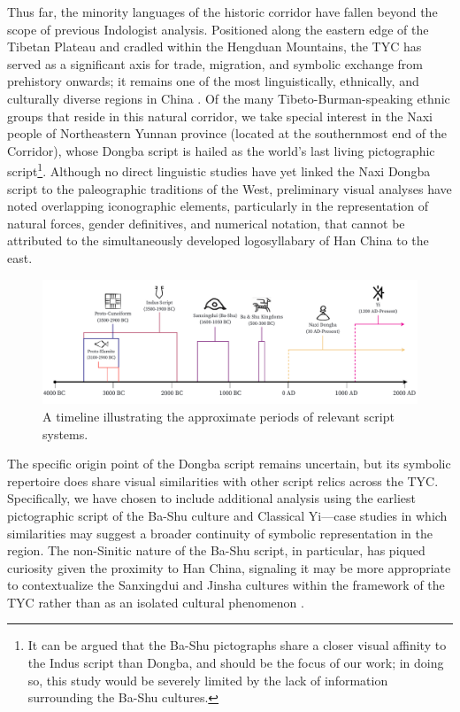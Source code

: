\documentclass[11pt,a4paper,oneside]{report}
\begin{document}
Thus far, the minority languages of the historic corridor have fallen beyond the scope of previous Indologist analysis. Positioned along the eastern edge of the Tibetan Plateau and cradled within the Hengduan Mountains, the TYC has served as a significant axis for trade, migration, and symbolic exchange from prehistory onwards; it remains one of the most linguistically, ethnically, and culturally diverse regions in China \cite{shi_ethnic_2018}. Of the many Tibeto-Burman-speaking ethnic groups that reside in this natural corridor, we take special interest in the Naxi people of Northeastern Yunnan province (located at the southernmost end of the Corridor), whose Dongba script is hailed as the world's last living pictographic script\footnote{It can be argued that the Ba-Shu pictographs share a closer visual affinity to the Indus script than Dongba, and should be the focus of our work; in doing so, this study would be severely limited by the lack of information surrounding the Ba-Shu cultures.}. Although no direct linguistic studies have yet linked the Naxi Dongba script to the paleographic traditions of the West, preliminary visual analyses \cite{city_museum_of_naxi_culture_comparison_nodate} have noted overlapping iconographic elements, particularly in the representation of natural forces, gender definitives, and numerical notation, that cannot be attributed to the simultaneously developed logosyllabary of Han China to the east.

\begin{figure}[H] 
    \centering
    \includegraphics[width=1\textwidth]{Visualizations/Figures/Timeline.pdf}
    \caption[Script Usage Timeline]{A timeline illustrating the approximate periods of relevant script systems.}
    \label{fig:timeline}
\end{figure}

The specific origin point of the Dongba script remains uncertain, but its symbolic repertoire does share visual similarities with other script relics across the TYC. Specifically, we have chosen to include additional analysis using the earliest pictographic script of the Ba-Shu culture and Classical Yi—case studies in which similarities may suggest a broader continuity of symbolic representation in the region. The non-Sinitic nature of the Ba-Shu script, in particular, has piqued curiosity given the proximity to Han China, signaling it may be more appropriate to contextualize the Sanxingdui and Jinsha cultures within the framework of the TYC rather than as an isolated cultural phenomenon \cite{sage_ancient_1992}.
\end{document}
